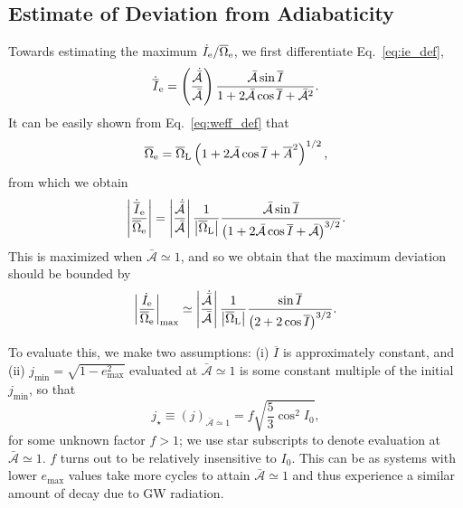 \documentclass[
        twocolumn,
        twocolappendix
    ]{aastex63}
\newcommand*{\abs}[1]{\left|#1\right|}
\newcommand*{\p}[1]{\left(#1\right)}
\begin{document}
\subsection{Estimate of Deviation from Adiabaticity}

Towards estimating the maximum $\dot{I}_{\rm e} / \overline{\Omega}_{\rm e}$, we
first differentiate Eq.~\eqref{eq:ie_def},
\begin{equation}
    \dot{\overline{I}}_{\rm e} = \p{\frac{\dot{\bar{\mathcal{A}}}}{
            \bar{\mathcal{A}}}}
        \frac{\bar{\mathcal{A}} \sin \overline{I}}{
            1 + 2\bar{\mathcal{A}}\cos \overline{I}
                + \bar{\mathcal{A}}^2}.
\end{equation}
It can be easily shown from Eq.~\eqref{eq:weff_def} that
\begin{equation}
    \overline{\Omega}_{\rm e} = \overline{\Omega}_{\rm L}
        \p{1 + 2\bar{\mathcal{A}}\cos \overline{I}
            + \overline{A}^2}^{1/2},
\end{equation}
from which we obtain
\begin{equation}
    \abs{\frac{\dot{\overline{I}}_{\rm e}}{\overline{\Omega}_{\rm e}}}
        = \abs{\frac{\dot{\bar{\mathcal{A}}}}{
            \bar{\mathcal{A}}}}
        \frac{1}{\abs{\overline{\Omega}_{\rm L}}}
        \frac{\bar{\mathcal{A}} \sin \overline{I}}{
            \p{1 + 2\bar{\mathcal{A}}\cos \overline{I}
                + \bar{\mathcal{A}}}^{3/2}}.
\end{equation}
This is maximized when $\bar{\mathcal{A}} \simeq 1$, and so we obtain that
the maximum deviation should be bounded by
\begin{equation}
    \abs{\frac{\dot{I}_{\rm e}}{\overline{\Omega}_{\rm e}}}_{\max}
        \simeq \abs{\frac{\dot{\bar{\mathcal{A}}}}{\bar{\mathcal{A}}}}
            \frac{1}{\abs{\overline{\Omega}_{\rm L}}}
            \frac{\sin \overline{I}}{\p{2 + 2\cos \overline{I}}^{3/2}}.
            \label{eq:idot_over_W}
\end{equation}

To evaluate this, we make two assumptions: (i) $\overline{I}$ is approximately
constant, and (ii) $j_{\min} = \sqrt{1 - e_{\max}^2}$ evaluated at
$\bar{\mathcal{A}} \simeq 1$ is some constant multiple of the initial
$j_{\min}$, so that
\begin{equation}
    j_{\star} \equiv (j)_{\bar{\mathcal{A}} \simeq 1} = f
        \sqrt{\frac{5}{3}\cos^2 I_0},\label{eq:jstar_ansatz}
\end{equation}
for some unknown factor $f > 1$; we use star subscripts to denote evaluation at
$\bar{\mathcal{A}} \simeq 1$. $f$ turns out to be relatively insensitive to
$I_0$. This can be as systems with lower $e_{\max}$ values take more
cycles to attain $\bar{\mathcal{A}} \simeq 1$ and thus experience a similar
amount of decay due to GW radiation.
\end{document}
